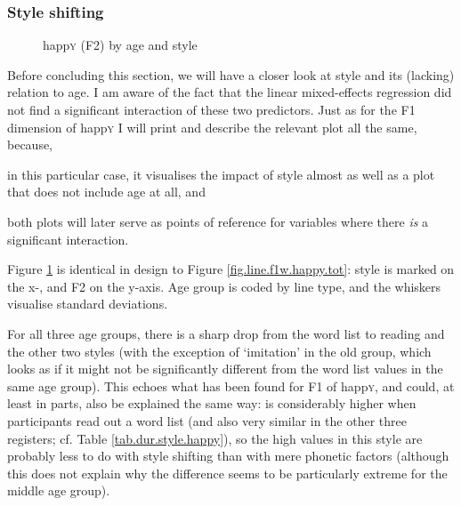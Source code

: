 \subsubsection{Style shifting}
\label{sec.prod.res.vow.happy.f2.shifting}

\begin{figure}[h!]
	\centering
		\resizebox{.5\linewidth}{!}{} 
	\caption{happ\textsc{y} (F2) by age and style}
	\label{fig.line.f2w.happy.tot}
\end{figure}

Before concluding this section, we will have a closer look at style and its (lacking) relation to age.
I am aware of the fact that the linear mixed-effects regression did not find a significant interaction of these two predictors.
Just as for the F1 dimension of happ\textsc{y} I will print and describe the relevant plot all the same, because,
\begin{inparaenum}[(a)]
	\item in this particular case, it visualises the impact of style almost as well as a plot that does not include age at all, and
	\item both plots will later serve as points of reference for variables where there \emph{is} a significant interaction.
\end{inparaenum}
Figure \ref{fig.line.f2w.happy.tot} is identical in design to Figure \ref{fig.line.f1w.happy.tot}: style is marked on the x-, and F2 on the y-axis.
Age group is coded by line type, and the whiskers visualise standard deviations.

For all three age groups, there is a sharp drop from the word list to reading and the other two styles (with the exception of `imitation' in the old group, which looks as if it might not be significantly different from the word list values in the same age group).
This echoes what has been found for F1 of happ\textsc{y}, and could, at least in parts, also be explained the same way:  is considerably higher when participants read out a word list (and also very similar in the other three registers; cf. Table \ref{tab.dur.style.happy}), so the high values in this style are probably less to do with style shifting than with mere phonetic factors (although this does not explain why the difference seems to be particularly extreme for the middle age group).

